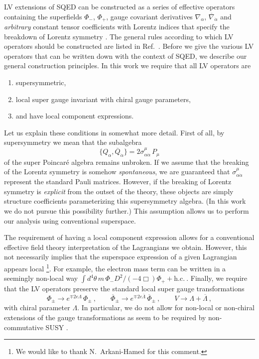 \documentclass[12pt]{revtex4}
\begin{document}
LV extensions of SQED can be constructed as a series of effective
operators containing the superfields $\Phi_-$, $\Phi_+$,
gauge covariant derivatives $ \nabla_\alpha $, 
$ \overline{\nabla}_{\dot\alpha} $ and
%
{\em arbitrary} constant tensor coefficients with Lorentz indices 
that specify the
breakdown of Lorentz symmetry \cite{GrootNibbelink:2004za}. 
The general rules according to which LV operators should be
constructed are listed in Ref.\ \cite{MP:}. Before we give the various
LV operators that can be written down with the context of SQED, we
describe our general construction principles. In this work we require
that all LV operators are  
\begin{enumerate}
\item supersymmetric, 
\item local super gauge invariant with chiral gauge parameters, 
\item and have local component expressions. 
\end{enumerate}
Let us explain these conditions in somewhat more detail. First of all,
by supersymmetry we mean that the subalgebra 
\begin{equation}
\{ Q_\alpha, \overline{Q}_{\dot\alpha} \} = 
2 \sigma^\mu_{\alpha\dot{\alpha}} \, P_\mu
\end{equation}
of the super Poincar\'e algebra remains unbroken. If we assume that 
the breaking of the Lorentz symmetry is somehow 
{\em spontaneous}, we are guaranteed that
$\sigma^\mu_{\alpha\dot{\alpha}}$ represent the standard Pauli
matrices. However, if the breaking of Lorentz symmetry is {\em
explicit} from the outset of the theory, these objects are simply 
structure coefficients parameterizing this supersymmetry algebra. (In
this work we do not pursue this possibility further.) This assumption
allows us to perform our analysis using conventional superspace. 


The requirement of having a local component expression allows for a
conventional effective field theory interpretation of the Lagrangians
we obtain. However, this not necessarily implies that the superspace
expression of a given Lagrangian appears local \footnote{We would 
like to thank N.\ Arkani-Hamed for this comment.}. For example, the
electron mass term can be written in a seemingly non-local way  
\(
\int d^4 \theta\, m \, \Phi_- D^2/(- 4\Box) \Phi_+ + \text{h.c.}~.
\)
%
Finally, we require that the LV operators preserve the standard local
super gauge transformations  
\begin{equation}
\Phi_\pm \rightarrow e^{\mp 2 e \Lambda} \, \Phi_\pm~, 
\qquad 
\overline{\Phi}_\pm \rightarrow e^{\mp 2 e \overline{\Lambda}} \, 
\overline{\Phi}_\pm~, 
\qquad 
V \rightarrow \Lambda + \overline{\Lambda}~, 
\label{Gauge}
\end{equation} 
with chiral parameter $\Lambda$. In particular, we do not allow for
non-local or non-chiral extensions of the gauge transformations as
seem to be required by non-commutative SUSY
\cite{Putz:2002ib,Mikulovic:2003sq}.  
\end{document}
